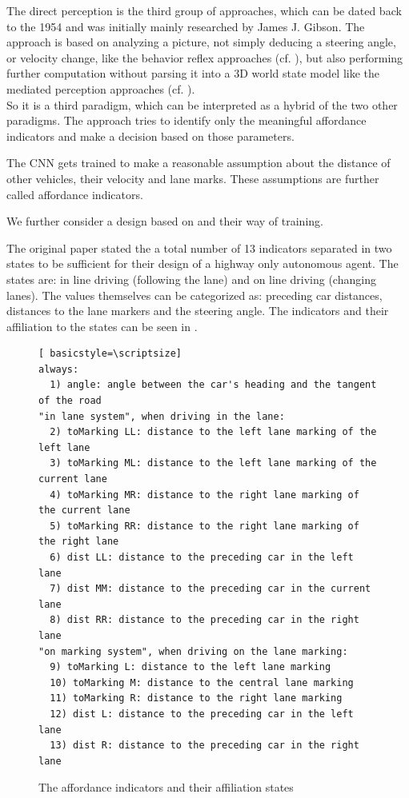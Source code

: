 The direct perception is the third group of approaches, which can be dated back to the 1954 and was initially mainly researched by James J. Gibson. \cite{gibson1954theory} The approach is based on analyzing a picture, not simply deducing a steering angle, or velocity change, like the behavior reflex approaches (cf. ), but also performing further computation without parsing it into a 3D world state model like the mediated perception approaches (cf. ). \cite{chen2015deepdriving}\\
So it is a third paradigm, which can be interpreted as a hybrid of the two other paradigms. The approach tries to identify only the meaningful affordance indicators and make a decision based on those parameters. 

The CNN gets trained to make a reasonable assumption about the distance of other vehicles, their velocity and lane marks. These assumptions are further called affordance indicators.

We further consider a design based on \cite{chen2015deepdriving} and their way of training.

The original paper \cite{chen2015deepdriving} stated the a total number of 13 indicators separated in two states to be sufficient for their design of a highway only autonomous agent. The states are: in line driving (following the lane) and on line driving (changing lanes). The values themselves can be categorized as: preceding car distances, distances to the lane markers and the steering angle. The indicators and their affiliation to the states can be seen in .

\begin{figure}
\centering
\todoLine
\begin{lstlisting}[ basicstyle=\scriptsize]
always:
  1) angle: angle between the car's heading and the tangent of the road
"in lane system", when driving in the lane:
  2) toMarking LL: distance to the left lane marking of the left lane
  3) toMarking ML: distance to the left lane marking of the current lane
  4) toMarking MR: distance to the right lane marking of the current lane
  5) toMarking RR: distance to the right lane marking of the right lane
  6) dist LL: distance to the preceding car in the left lane
  7) dist MM: distance to the preceding car in the current lane
  8) dist RR: distance to the preceding car in the right lane
"on marking system", when driving on the lane marking:
  9) toMarking L: distance to the left lane marking
  10) toMarking M: distance to the central lane marking
  11) toMarking R: distance to the right lane marking
  12) dist L: distance to the preceding car in the left lane
  13) dist R: distance to the preceding car in the right lane
\end{lstlisting}

\todoLine
\caption{The affordance indicators and their affiliation states}
\label{lst: affordance indicators}
\end{figure}

